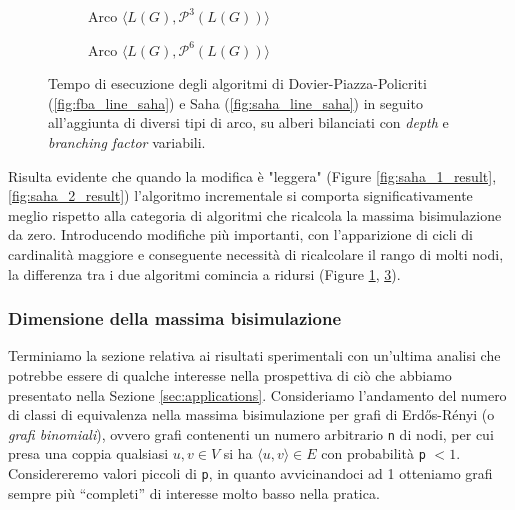 \begin{figure}[H]
\begin{subfigure}[b]{0.49\textwidth}
            \caption{Arco $\langle L(G), \mathcal{P}^3(L(G))\rangle$}
            \label{fig:saha_3_result}
        \end{subfigure}
        \begin{subfigure}[b]{0.49\textwidth}
            \caption{Arco $\langle L(G), \mathcal{P}^6(L(G))\rangle$}
            \label{fig:saha_4_result}
        \end{subfigure}
    \caption{Tempo di esecuzione degli algoritmi di Dovier-Piazza-Policriti (\ref*{fig:fba_line_saha}) e Saha (\ref*{fig:saha_line_saha}) in seguito all'aggiunta di diversi tipi di arco, su alberi bilanciati con \emph{depth} e \emph{branching factor} variabili.}
\end{figure}

Risulta evidente che quando la modifica è "leggera" (Figure \ref{fig:saha_1_result}, \ref{fig:saha_2_result}) l'algoritmo incrementale si comporta significativamente meglio rispetto alla categoria di algoritmi che ricalcola la massima bisimulazione da zero. Introducendo modifiche più importanti, con l'apparizione di cicli di cardinalità maggiore e conseguente necessità di ricalcolare il rango di molti nodi, la differenza tra i due algoritmi comincia a ridursi (Figure \ref{fig:saha_3_result}, \ref{fig:saha_4_result}).

\subsubsection{Dimensione della massima bisimulazione}
Terminiamo la sezione relativa ai risultati sperimentali con un'ultima analisi che potrebbe essere di qualche interesse nella prospettiva di ciò che abbiamo presentato nella Sezione \ref{sec:applications}. Consideriamo l'andamento del numero di classi di equivalenza nella massima bisimulazione per grafi di Erdős-Rényi (o \emph{grafi binomiali}), ovvero grafi contenenti un numero arbitrario \verb|n| di nodi, per cui presa una coppia qualsiasi $u,v \in V$ si ha $\langle u,v\rangle \in E$ con probabilità \verb|p| $< 1$.
Considereremo valori piccoli di \verb|p|, in quanto avvicinandoci ad 1 otteniamo grafi sempre più ``completi'' di interesse molto basso nella pratica.

